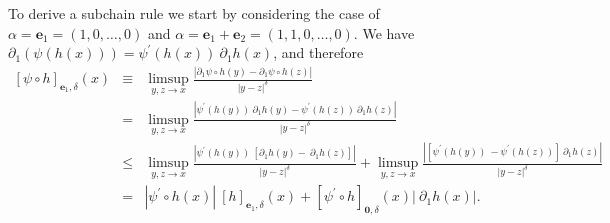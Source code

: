 \documentclass{amsart}
\theoremstyle{plain}
\numberwithin{equation}{section}
\begin{document}
To derive a subchain rule we start by considering the case of $\alpha=%
\mathbf{e}_{1}=(1,0,\dots, 0)$ and $\alpha=\mathbf{e}_{1}+\mathbf{e}%
_{2}=(1,1,0,\dots,0)$. We have $\partial _{1}\left( \psi \left( h\left(
x\right) \right) \right) =\psi ^{\prime }\left( h\left( x\right) \right) \
\partial _{1}h\left( x\right) $, and therefore 
\begin{eqnarray*}
\left[ \psi \circ h\right] _{\mathbf{e}_{1},\delta }\left( x\right) &\equiv
&\limsup_{y,z\rightarrow x}\frac{\left\vert \partial _{1}\psi \circ h\left(
y\right) -\partial _{1}\psi \circ h\left( z\right) \right\vert }{\left\vert
y-z\right\vert ^{\delta }} \\
&=&\limsup_{y,z\rightarrow x}\frac{\left\vert \psi ^{\prime }\left( h\left(
y\right) \right) \ \partial _{1}h\left( y\right) -\psi ^{\prime }\left(
h\left( z\right) \right) \ \partial _{1}h\left( z\right) \right\vert }{
\left\vert y-z\right\vert ^{\delta }} \\
&\leq &\limsup_{y,z\rightarrow x}\frac{\left\vert \psi ^{\prime }\left(
h\left( y\right) \right) \ \left[ \partial _{1}h\left( y\right) -\ \partial
_{1}h\left( z\right) \right] \right\vert }{\left\vert y-z\right\vert
^{\delta }}+\limsup_{y,z\rightarrow x}\frac{\left\vert \left[ \psi ^{\prime
}\left( h\left( y\right) \right) \ -\psi ^{\prime }\left( h\left( z\right)
\right) \right] \ \partial _{1}h\left( z\right) \right\vert }{\left\vert
y-z\right\vert ^{\delta }} \\
&=&\left\vert \psi ^{\prime }\circ h\left( x\right) \right\vert \ \left[ h %
\right] _{\mathbf{e}_{1},\delta }\left( x\right) +\left[ \psi ^{\prime
}\circ h\right] _{\mathbf{0},\delta }\left( x\right) \left\vert \ \partial
_{1}h\left( x\right) \right\vert .
\end{eqnarray*}
\end{document}
